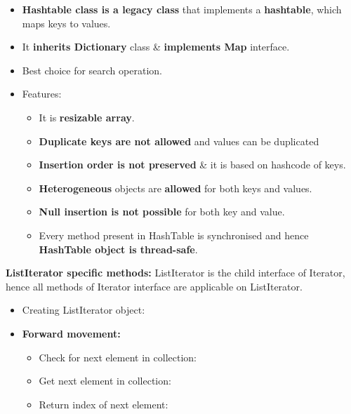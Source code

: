 \setlength{\columnsep}{3pt}
\begin{flushleft}
	
	\begin{itemize}
		\item \textbf{Hashtable class is a legacy class} that implements a \textbf{hashtable}, which maps keys to values. 
		\item It \textbf{inherits Dictionary} class \& \textbf{implements Map} interface.
		\item Best choice for search operation.
		
		
		\item Features:
		\begin{itemize}
			\item It is \textbf{resizable array}.
			\item \textbf{Duplicate keys are not allowed} and values can be duplicated
			\item \textbf{Insertion order is not preserved} \& it is based on hashcode of keys.
			\item \textbf{Heterogeneous} objects are \textbf{allowed} for both keys and values.
			\item \textbf{Null insertion is not possible} for both key and value.
			\item Every method present in HashTable is synchronised and hence \textbf{HashTable object is thread-safe}.
		\end{itemize}
		

		
	\end{itemize}
	
	\textbf{ListIterator specific methods:}
	ListIterator is the child interface of Iterator, hence all methods of Iterator interface are applicable on ListIterator.
	
	\begin{itemize}
		\item Creating ListIterator object:
		\bigskip
		\item \textbf{Forward movement:}
		\begin{itemize}
			\item Check for next element in collection: 
			\bigskip
			\item Get next element in collection: 
			\bigskip
			\item Return index of next element:
		\end{itemize}
		

\end{itemize}
\end{flushleft}
